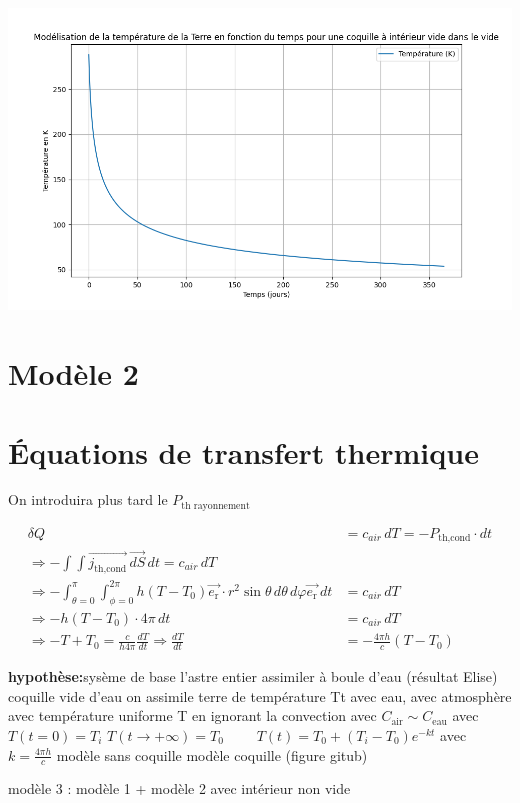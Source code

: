 \documentclass[a4paper,12pt]{article}
\begin{document}
    \includegraphics[width=0.8\linewidth]{../figures/modele1_coquille.png} 


\section{Modèle 2}
\section*{Équations de transfert thermique}

On introduira plus tard le \(P_{\text{th rayonnement}}\)

\begin{align*}
\delta Q &= c_{air}\, dT = -P_{\text{th,cond}} \cdot dt \\
\Rightarrow -\int \int \vec{j_{\text{th,cond}}}\, \vec{dS}\,dt = c_{air}\, dT \\
\Rightarrow -\int_{\theta=0}^\pi \int_{\phi=0}^{2\pi} h(T - T_0) \vec{e_{\text{r}}}\cdot r^2 \sin\theta\, d\theta\, d\varphi \vec{e_{\text{r}}}\, dt &=  c_{air}\, dT  \\
\Rightarrow -h(T - T_0) \cdot 4\pi\, dt &= c_{air}\, dT \\
\Rightarrow -T + T_0 = \frac{c}{h 4\pi} \frac{dT}{dt} \Rightarrow \frac{dT}{dt} &= -\frac{4\pi h}{c}(T - T_0)
\end{align*}

\vspace{0.5cm}
\textbf{hypothèse:}sysème de base l'astre entier assimiler à boule d'eau (résultat Elise)
coquille vide d'eau 
on assimile terre de température Tt avec eau, avec atmosphère avec température uniforme T  en ignorant la convection 
avec \(C_{\text{air}}\sim C_{\text{eau}}\)
avec  $T(t=0) = T_i$ 
$T(t \to +\infty) = T_0$  \ \ \ \
$T(t) = T_0 + (T_i - T_0)e^{-kt}$ \quad avec $k = \frac{4\pi h}{c}$
modèle sans coquille 
modèle coquille (figure gitub)

modèle 3 : modèle 1 + modèle 2 avec intérieur non vide 

 
\vspace{1cm}
\end{document}
